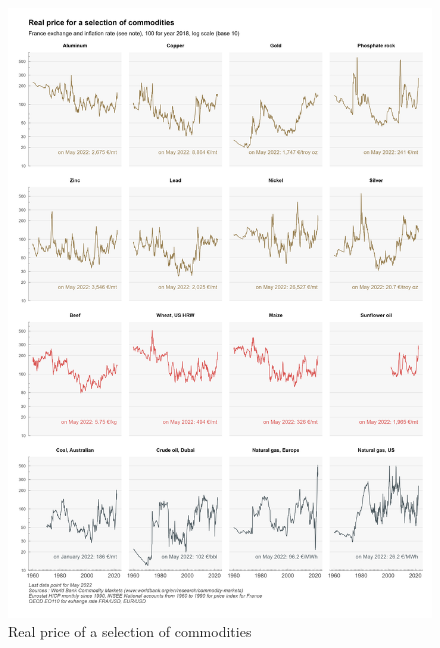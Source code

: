 \documentclass[
  9pt,
  a4paper,
  DIV=11,
  numbers=noendperiod]{scrartcl}
\begin{document}
\begin{figure}

\caption{Real price of a selection of commodities}

{\centering \includegraphics[width=16cm,height=\textheight]{../svg/gcom.png}

}

\end{figure}
\end{document}
